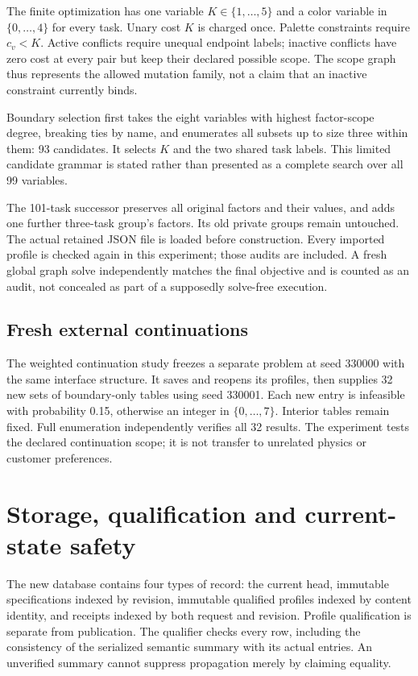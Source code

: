 \documentclass[11pt,letterpaper]{article}
\theoremstyle{definition}\newtheorem{definition}[theorem]{Definition}
\theoremstyle{remark}\newtheorem{remark}[theorem]{Remark}
\begin{document}
The finite optimization has one variable $K\in\{1,\ldots,5\}$ and a color variable in $\{0,\ldots,4\}$ for every task. Unary cost $K$ is charged once. Palette constraints require $c_v<K$. Active conflicts require unequal endpoint labels; inactive conflicts have zero cost at every pair but keep their declared possible scope. The scope graph thus represents the allowed mutation family, not a claim that an inactive constraint currently binds.

Boundary selection first takes the eight variables with highest factor-scope degree, breaking ties by name, and enumerates all subsets up to size three within them: 93 candidates. It selects $K$ and the two shared task labels. This limited candidate grammar is stated rather than presented as a complete search over all 99 variables.

The 101-task successor preserves all original factors and their values, and adds one further three-task group's factors. Its old private groups remain untouched. The actual retained JSON file is loaded before construction. Every imported profile is checked again in this experiment; those audits are included. A fresh global graph solve independently matches the final objective and is counted as an audit, not concealed as part of a supposedly solve-free execution.

\subsection{Fresh external continuations}
The weighted continuation study freezes a separate problem at seed 330000 with the same interface structure. It saves and reopens its profiles, then supplies 32 new sets of boundary-only tables using seed 330001. Each new entry is infeasible with probability 0.15, otherwise an integer in $\{0,\ldots,7\}$. Interior tables remain fixed. Full enumeration independently verifies all 32 results. The experiment tests the declared continuation scope; it is not transfer to unrelated physics or customer preferences.

\section{Storage, qualification and current-state safety}
\label{app:storage}
The new database contains four types of record: the current head, immutable specifications indexed by revision, immutable qualified profiles indexed by content identity, and receipts indexed by both request and revision. Profile qualification is separate from publication. The qualifier checks every row, including the consistency of the serialized semantic summary with its actual entries. An unverified summary cannot suppress propagation merely by claiming equality.
\end{document}
